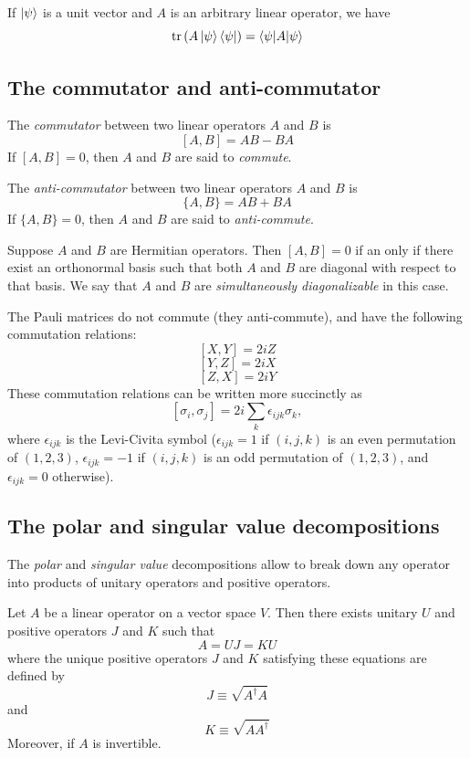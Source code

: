If $\ket{\psi}$ is a unit vector and $A$ is an arbitrary linear operator,
we have
\[
    \operatorname{tr}\left(A\ket{\psi}\bra{\psi}\right) = \braket{\psi|A|\psi}
\]

\subsection{The commutator and anti-commutator}
The \emph{commutator} between two linear operators $A$ and $B$ is
\[
    [A, B] = AB - BA
\]
If $[A, B] = 0$, then $A$ and $B$ are said to \emph{commute}.

The \emph{anti-commutator} between two linear operators $A$ and $B$ is
\[
    \{A, B\} = AB + BA
\]
If $\{A, B\} = 0$, then $A$ and $B$ are said to \emph{anti-commute}.

\begin{theorem}
    Suppose $A$ and $B$ are Hermitian operators. 
    Then $[A, B]=0$ if an only if there exist an orthonormal basis such that both $A$ and $B$ are diagonal with respect to that basis.
    We say that $A$ and $B$ are \emph{simultaneously diagonalizable} in this case.        
\end{theorem}

The Pauli matrices do not commute (they anti-commute), and have the following commutation relations:
\[
    [X,Y] = 2iZ
\]
\[
    [Y,Z] = 2iX
\]
\[
    [Z,X] = 2iY
\]
These commutation relations can be written more succinctly as
\[
    [\sigma_i, \sigma_j] = 2i\sum_k \epsilon_{ijk}\sigma_k,
\]
where $\epsilon_{ijk}$ is the Levi-Civita symbol 
($\epsilon_{ijk} = 1$ if $(i,j,k)$ is an even permutation of $(1,2,3)$,
$\epsilon_{ijk} = -1$ if $(i,j,k)$ is an odd permutation of $(1,2,3)$,
and $\epsilon_{ijk} = 0$ otherwise).

\subsection{The polar and singular value decompositions}
The \emph{polar} and \emph{singular value} decompositions allow to break down any operator into products of unitary operators and positive operators.

\begin{theorem}
    Let $A$ be a linear operator on a vector space $V$.
    Then there exists unitary $U$ and positive operators $J$ and $K$ such that
    \[
        A = UJ = KU
    \]
    where the unique positive operators $J$ and $K$ satisfying these equations are defined by
    \[
        J \equiv \sqrt{A^\dagger A}
    \]
    and
    \[
        K \equiv \sqrt{AA^\dagger}
    \]
    Moreover, if $A$ is invertible.
\end{theorem}

